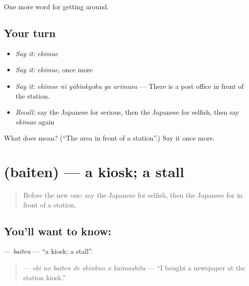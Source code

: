 \begin{grammarlens}[title={What you've built}]
One more word for getting around.
\end{grammarlens}

\subsection*{Your turn}
\begin{itemize}
\raggedright
  \item \emph{Say it:} \emph{ekimae}
  \item \emph{Say it:} \emph{ekimae}, once more
  \item \emph{Say it:} \emph{ekimae ni yūbinkyoku ga arimasu} — There is a post office in front of the station.
  \item \emph{Recall:} say the Japanese for serious, then the Japanese for selfish, then say \emph{ekimae} again
\end{itemize}

\begin{tcolorbox}[breakable,colback=teal!4,colframe=teal!35!black,title={Before you move on}]
What does  mean? (\textquotedblleft{}The area in front of a station\textquotedblright{}.) Say it once more.
\end{tcolorbox}
\section[\texorpdfstring{\ja{ばいてん} (baiten)}{ばいてん (baiten)}]{ (baiten) — a kiosk; a stall}

\label{lesson:JA-C372-baiten}



\begin{quote}
Before the new one: say the Japanese for selfish, then the Japanese for in front of a station.
\end{quote}

\subsection*{You'll want to know: }
\textbf{} — \emph{baiten} — \textquotedblleft{}a kiosk; a stall\textquotedblright{}.

\begin{quote}
\textbf{   } — \emph{eki no baiten de shinbun o kaimashita} — \textquotedblleft{}I bought a newspaper at the station kiosk.\textquotedblright{}
\end{quote}

